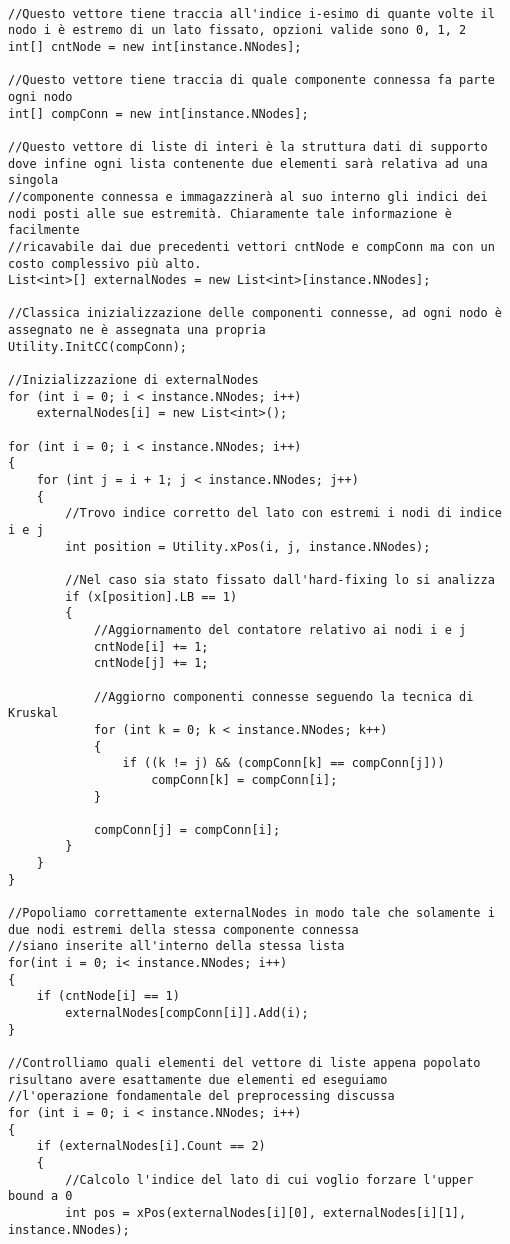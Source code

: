 \documentclass[11pt]{article}
\begin{document}
\begin{lstlisting}

//Questo vettore tiene traccia all'indice i-esimo di quante volte il nodo i è estremo di un lato fissato, opzioni valide sono 0, 1, 2
int[] cntNode = new int[instance.NNodes];

//Questo vettore tiene traccia di quale componente connessa fa parte ogni nodo
int[] compConn = new int[instance.NNodes];

//Questo vettore di liste di interi è la struttura dati di supporto dove infine ogni lista contenente due elementi sarà relativa ad una singola
//componente connessa e immagazzinerà al suo interno gli indici dei nodi posti alle sue estremità. Chiaramente tale informazione è facilmente
//ricavabile dai due precedenti vettori cntNode e compConn ma con un costo complessivo più alto.
List<int>[] externalNodes = new List<int>[instance.NNodes];

//Classica inizializzazione delle componenti connesse, ad ogni nodo è assegnato ne è assegnata una propria
Utility.InitCC(compConn);

//Inizializzazione di externalNodes
for (int i = 0; i < instance.NNodes; i++)
    externalNodes[i] = new List<int>();

for (int i = 0; i < instance.NNodes; i++)
{
    for (int j = i + 1; j < instance.NNodes; j++)
    {
        //Trovo indice corretto del lato con estremi i nodi di indice i e j
        int position = Utility.xPos(i, j, instance.NNodes);

        //Nel caso sia stato fissato dall'hard-fixing lo si analizza
        if (x[position].LB == 1)
        {
            //Aggiornamento del contatore relativo ai nodi i e j
            cntNode[i] += 1;
            cntNode[j] += 1;

            //Aggiorno componenti connesse seguendo la tecnica di Kruskal
            for (int k = 0; k < instance.NNodes; k++)
            {
                if ((k != j) && (compConn[k] == compConn[j]))
                    compConn[k] = compConn[i];
            }

            compConn[j] = compConn[i];
        }
    }
}

//Popoliamo correttamente externalNodes in modo tale che solamente i due nodi estremi della stessa componente connessa
//siano inserite all'interno della stessa lista
for(int i = 0; i< instance.NNodes; i++)
{
    if (cntNode[i] == 1)
        externalNodes[compConn[i]].Add(i);
}

//Controlliamo quali elementi del vettore di liste appena popolato risultano avere esattamente due elementi ed eseguiamo
//l'operazione fondamentale del preprocessing discussa
for (int i = 0; i < instance.NNodes; i++)
{
    if (externalNodes[i].Count == 2)
    {
        //Calcolo l'indice del lato di cui voglio forzare l'upper bound a 0
        int pos = xPos(externalNodes[i][0], externalNodes[i][1], instance.NNodes);


\end{lstlisting}
\end{document}
